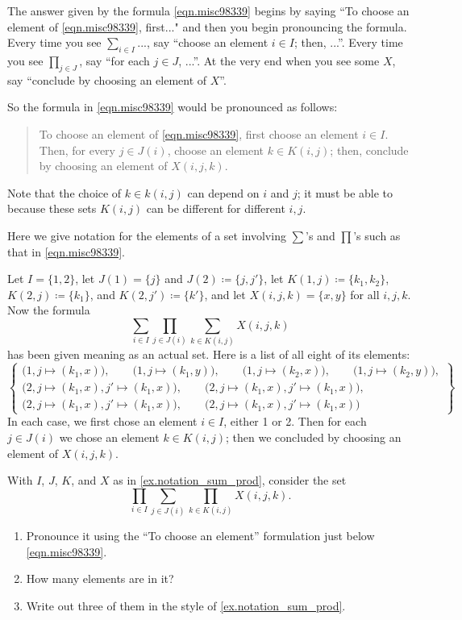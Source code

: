 \documentclass[DynamicalBook]{subfiles}
\begin{document}
The answer given by the formula \eqref{eqn.misc98339} begins by saying ``To choose an element of \eqref{eqn.misc98339}, first..." and then you begin pronouncing the formula. Every time you see $\sum_{i\in I}...$, say ``choose an element $i\in I$; then, ...''. Every time you see $\prod_{j\in J}$, say ``for each $j\in J$, ...''. At the very end when you see some $X$, say ``conclude by choosing an element of $X$''.

So the formula in \eqref{eqn.misc98339} would be pronounced as follows:
\begin{quote}
To choose an element of \eqref{eqn.misc98339}, first choose an element $i\in I$. Then, for every $j\in J(i)$, choose an element $k\in K(i,j)$; then, conclude by choosing an element of $X(i,j,k)$.
\end{quote}
Note that the choice of $k\in k(i,j)$ can depend on $i$ and $j$; it must be able to because these sets $K(i,j)$ can be different for different $i,j$.

\begin{example}\label{ex.notation_sum_prod}
Here we give notation for the elements of a set involving $\sum$'s and $\prod$'s such as that in \eqref{eqn.misc98339}.

Let $I=\{1,2\}$, let $J(1)=\{j\}$ and $J(2)\coloneqq\{j,j'\}$, let $K(1,j)\coloneqq\{k_1,k_2\}$, $K(2,j)\coloneqq\{k_1\}$, and $K(2,j')\coloneqq\{k'\}$, and let $X(i,j,k)=\{x,y\}$ for all $i,j,k$. Now the formula 
\[\sum_{i\in I}\prod_{j\in J(i)}\sum_{k\in K(i,j)}X(i,j,k)\]
 has been given meaning as an actual set. Here is a list of all eight of its elements:
\[
\left\{
\begin{gathered}
	\big(1, j\mapsto(k_1,x)\big),\qquad
	\big(1, j\mapsto(k_1,y)\big),\qquad
	\big(1, j\mapsto(k_2,x)\big),\qquad
	\big(1, j\mapsto(k_2,y)\big),\\
	\big(2, j\mapsto(k_1,x), j'\mapsto(k_1,x)\big),\qquad
	\big(2, j\mapsto(k_1,x), j'\mapsto(k_1,x)\big),\\
	\big(2, j\mapsto(k_1,x), j'\mapsto(k_1,x)\big),\qquad
	\big(2, j\mapsto(k_1,x), j'\mapsto(k_1,x)\big)
\end{gathered}
\right\}
\]
In each case, we first chose an element $i\in I$, either 1 or 2. Then for each $j\in J(i)$ we chose an element $k\in K(i,j)$; then we concluded by choosing an element of $X(i,j,k)$.
\end{example}

\begin{exercise}
With $I$, $J$, $K$, and $X$ as in \cref{ex.notation_sum_prod}, consider the set
\[\prod_{i\in I}\sum_{j\in J(i)}\prod_{k\in K(i,j)}X(i,j,k).\]
\begin{enumerate}
	\item Pronounce it using the ``To choose an element'' formulation just below \eqref{eqn.misc98339}.
	\item How many elements are in it?
	\item Write out three of them in the style of \cref{ex.notation_sum_prod}.
\qedhere
\end{enumerate}
\end{exercise}
\end{document}

